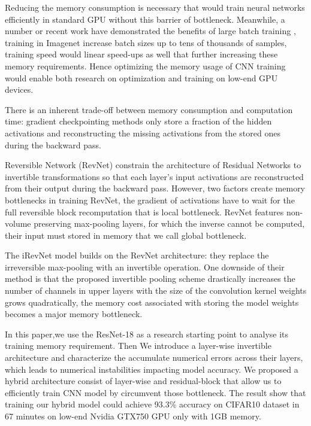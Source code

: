 \documentclass[10pt,twocolumn,letterpaper]{article}
\begin{document}
  Reducing the memory consumption is necessary that would train neural networks efficiently in standard GPU without this barrier of bottleneck. Meanwhile, a number or recent work have demonstrated the benefits of large batch training \cite{largebatch}, training in Imagenet increase batch sizes up to tens of thousands of samples, training speed would linear speed-ups as well that further increasing these memory requirements. Hence optimizing the memory usage of CNN training would enable both research on optimization and training on low-end GPU devices.

  There is an inherent trade-off between memory consumption and computation time: gradient checkpointing methods \cite{chen2016training} only store a fraction of the hidden activations and reconstructing the missing activations from the stored ones during the backward pass.
  
   Reversible Network (RevNet) \cite{gomez2017reversible} constrain the architecture of Residual Networks to invertible transformations so that each layer’s input activations are reconstructed from their output during the backward pass.
  However, two factors create memory bottlenecks in training RevNet, the gradient of activations have to wait for the full reversible block recomputation that is local bottleneck. RevNet features non-volume preserving max-pooling layers, for which the inverse cannot be computed, their input must stored in memory that we call global bottleneck. 
  
  The iRevNet \cite{jacobsen2018revnet} model builds on the RevNet architecture: they replace the irreversible max-pooling with an invertible operation. One downside of their method is that the proposed invertible pooling scheme drastically increases the number of channels in upper layers with the size of the convolution kernel weights grows quadratically, the memory cost associated with storing the model weights becomes a major memory bottleneck. 
  
 In this paper,we use the ResNet-18 as a research starting point to analyse its training memory requirement. Then We introduce a layer-wise invertible architecture and characterize the accumulate numerical errors across their layers, which leads to numerical instabilities impacting model accuracy. We proposed a hybrid architecture consist of layer-wise and residual-block that allow us to efficiently train CNN model by circumvent those bottleneck. The result show that training our hybrid model could achieve 93.3\% accuracy on CIFAR10 dataset in 67 minutes on low-end Nvidia GTX750 GPU only with 1GB memory.  
    
\end{document}
